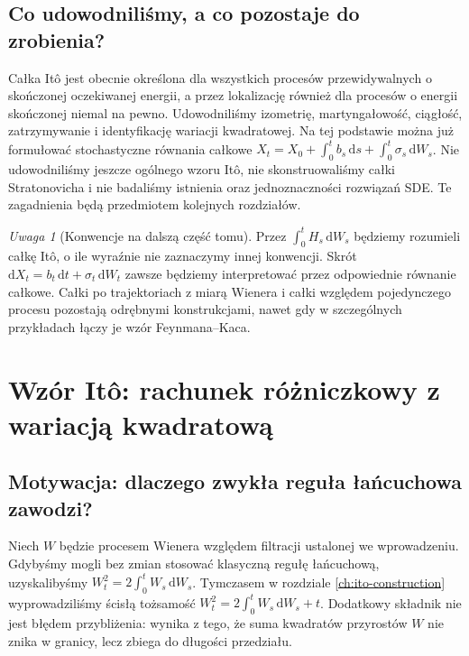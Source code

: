 \documentclass[11pt,a4paper,oneside]{report}
\numberwithin{equation}{chapter}
\theoremstyle{plain}
\theoremstyle{definition}
\theoremstyle{remark}
\newtheorem{uwaga}{Uwaga}[chapter]
\newcommand{\dd}{\mathrm{d}}
\begin{document}
\section{Co udowodniliśmy, a co pozostaje do zrobienia?}\label{sec:volIII:02:10}
Całka Itô jest obecnie określona dla wszystkich
procesów przewidywalnych o skończonej oczekiwanej energii,
a przez lokalizację również dla procesów o energii
skończonej niemal na pewno. Udowodniliśmy izometrię,
martyngałowość, ciągłość, zatrzymywanie i identyfikację
wariacji kwadratowej. Na tej podstawie można już
formułować stochastyczne równania całkowe
$X_t=X_0+\int_0^tb_s\,\dd s+\int_0^t\sigma_s\,\dd W_s$.
Nie udowodniliśmy jeszcze ogólnego wzoru Itô,
nie skonstruowaliśmy całki Stratonovicha i nie badaliśmy
istnienia oraz jednoznaczności rozwiązań SDE.
Te zagadnienia będą przedmiotem kolejnych rozdziałów.

\begin{uwaga}[Konwencje na dalszą część tomu]
Przez $\int_0^tH_s\,\dd W_s$ będziemy rozumieli
całkę Itô, o ile wyraźnie nie zaznaczymy innej
konwencji. Skrót $\dd X_t=b_t\,\dd t+\sigma_t\,\dd W_t$
zawsze będziemy interpretować przez odpowiednie
równanie całkowe. Całki po trajektoriach z miarą
Wienera i całki względem pojedynczego procesu
pozostają odrębnymi konstrukcjami, nawet gdy
w szczególnych przykładach łączy je wzór Feynmana--Kaca.
\end{uwaga}
\chapter{Wzór Itô: rachunek różniczkowy z wariacją kwadratową}
\label{chap:volIII:03}
\par\smallskip{}\par\smallskip

\label{ch:ito-formula}

\section{Motywacja: dlaczego zwykła reguła łańcuchowa zawodzi?}\label{sec:volIII:03:01}
Niech $W$ będzie procesem Wienera względem filtracji ustalonej
we wprowadzeniu. Gdybyśmy mogli bez zmian stosować klasyczną
regułę łańcuchową, uzyskalibyśmy
$W_t^2=2\int_0^tW_s\,\dd W_s$. Tymczasem w rozdziale
\ref{ch:ito-construction} wyprowadziliśmy ścisłą tożsamość
$W_t^2=2\int_0^tW_s\,\dd W_s+t$.
Dodatkowy składnik nie jest błędem przybliżenia: wynika z tego,
że suma kwadratów przyrostów $W$ nie znika w granicy, lecz
zbiega do długości przedziału.
\end{document}
